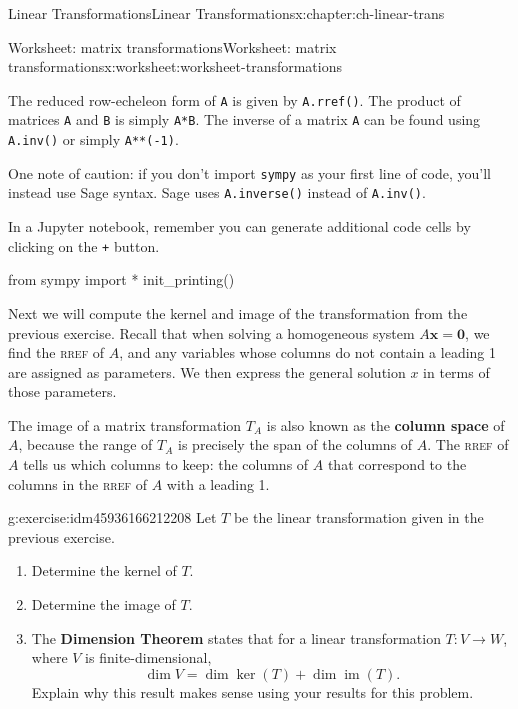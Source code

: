\documentclass[oneside,10pt,]{book}
\newcommand{\mono}[1]{\texttt{#1}}
\newcommand{\initialism}[1]{\textsc{\MakeLowercase{#1}}}
\newcommand{\terminology}[1]{\textbf{#1}}
\numberwithin{equation}{section}
\newcommand{\im}{\operatorname{im}}
\newcommand{\xx}{\mathbf{x}}
\newcommand{\zer}{\mathbf{0}}
\begin{document}
\begin{chapterptx}{Linear Transformations}{}{Linear Transformations}{}{}{x:chapter:ch-linear-trans}
\begin{worksheet-section}{Worksheet: matrix transformations}{}{Worksheet: matrix transformations}{}{}{x:worksheet:worksheet-transformations}
\par
The reduced row-echeleon form of \mono{A} is given by \mono{A.rref()}. The product of matrices \mono{A} and \mono{B} is simply \mono{A*B}. The inverse of a matrix \mono{A} can be found using \mono{A.inv()} or simply \mono{A**(-1)}.%
\par
One note of caution: if you don't import \mono{sympy} as your first line of code, you'll instead use Sage syntax. Sage uses \mono{A.inverse()} instead of \mono{A.inv()}.%
\par
In a Jupyter notebook, remember you can generate additional code cells by clicking on the \mono{+} button.%
\begin{sageinput}
from sympy import *
init_printing()
\end{sageinput}
Next we will compute the kernel and image of the transformation from the previous exercise. Recall that when solving a homogeneous system \(A\xx = \zer\), we find the \initialism{RREF} of \(A\), and any variables whose columns do not contain a leading 1 are assigned as parameters. We then express the general solution \(x\) in terms of those parameters.%
\par
The image of a matrix transformation \(T_A\) is also known as the \terminology{column space} of \(A\), because the range of \(T_A\) is precisely the span of the columns of \(A\). The \initialism{RREF} of \(A\) tells us which columns to keep: the columns of \(A\) that correspond to the columns in the \initialism{RREF} of \(A\) with a leading 1.%
\begin{divisionexercise}{2}{}{}{g:exercise:idm45936166212208}%
Let \(T\) be the linear transformation given in the previous exercise.%
\begin{enumerate}[font=\bfseries,label=(\alph*),ref=\alph*]
\item{}Determine the kernel of \(T\).%
\item{}Determine the image of \(T\).%
\item{}The \terminology{Dimension Theorem} states that for a linear transformation \(T:V\to W\), where \(V\) is finite-dimensional,%
\begin{equation*}
\dim V = \dim\ker(T)+ \dim\im(T)\text{.}
\end{equation*}
Explain why this result makes sense using your results for this problem.%
\end{enumerate}
\end{divisionexercise}%
\end{worksheet-section}
\restoregeometry
%
%
\typeout{************************************************}

\end{chapterptx}
\end{document}
